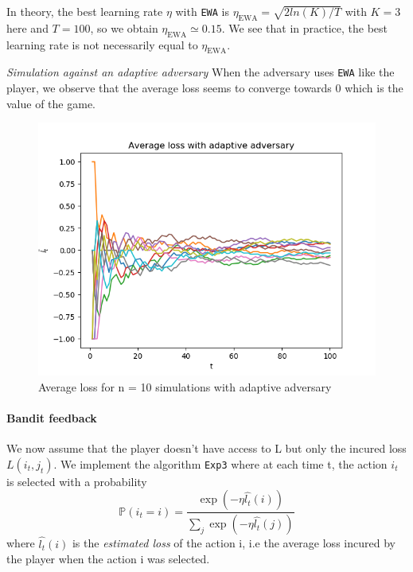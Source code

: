In theory, the best learning rate $\eta$ with \texttt{EWA} is $\eta_{\text{EWA}} = \sqrt{2 ln(K) / T}$ with $K = 3$ here and $T = 100$, so we obtain $\eta_{\text{EWA}} \simeq 0.15$. We see that in practice, the best learning rate is not necessarily equal to $\eta_{\text{EWA}}$. 

 \textit{Simulation against an adaptive adversary}
When the adversary uses \texttt{EWA} like the player, we observe that the average loss seems to converge towards 0 which is the value of the game.

\begin{figure}
	\includegraphics[width=\textwidth]{images/question4a}
	\caption{Average loss for n = 10 simulations with adaptive adversary}
	\label{fig:question4a}
\end{figure}


\paragraph*{Bandit feedback} We now assume that the player doesn't have access to L but only the incured loss $L(i_t, j_t)$. We implement the algorithm \texttt{Exp3} where at each time t, the action $i_t$ is selected with a probability
$$
\mathbb{P}(i_t = i) = \frac{\exp{(- \eta \hat{l_t}(i))}}{\sum_j \exp{(- \eta \hat{l_t}(j))}}
$$
where $\hat{l_t}(i)$ is the \textit{estimated loss} of the action i, i.e the average loss incured by the player when the action i was selected. 